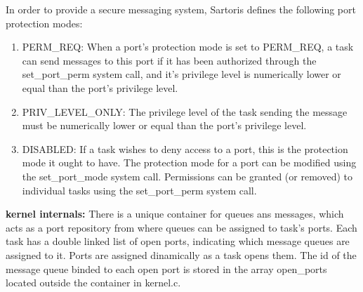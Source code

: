 \documentclass[11pt, letterpaper, twoside, english]{book}
\begin{document}
In order to provide a secure messaging system, Sartoris defines the following port protection modes:
\begin{enumerate}
\item[]\textsf{PERM\_REQ}: When a port's protection mode is set to \textsf{PERM\_REQ}, a task can send messages to this port if it has been authorized through the \textsf{set\_port\_perm} system call, and it's privilege level is numerically lower or equal than the port's privilege level.
\item[]\textsf{PRIV\_LEVEL\_ONLY}: The privilege level of the task sending the message must be numerically lower or equal than the port's privilege level.
\item[]\textsf{DISABLED}: If a task wishes to deny access to a port, this is the protection mode it ought to have.
The protection mode for a port can be modified using the \textsf{set\_port\_mode} system call. Permissions can be granted (or removed) to individual tasks using the \textsf{set\_port\_perm} system call.
\end{enumerate} 

\textbf{kernel internals:} There is a unique container for queues ans messages, which acts as a port repository from where queues can be assigned to task's ports. Each task has a double linked list of open ports, indicating which message queues are assigned to it. Ports are assigned dinamically as a task opens them. The \textsf{id} of the message queue binded to each open port is stored in the array \textsf{open\_ports} located outside the container in \textsf{kernel.c}. 
\end{document}
